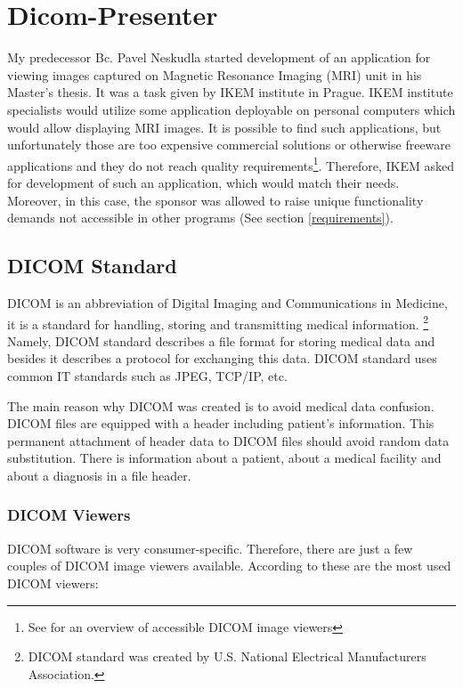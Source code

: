 \chapter{Dicom-Presenter}
\vspace{-10mm}
My predecessor Bc. Pavel Neskudla started development of an application for viewing images captured on Magnetic Resonance Imaging (MRI) unit in his Master's thesis\cite{neskudla}. It was a task given by IKEM institute in Prague. IKEM institute specialists would utilize some application deployable on personal computers which would allow displaying MRI images. It is possible to find such applications, but unfortunately those are too expensive commercial solutions or otherwise freeware applications and they do not reach quality requirements\footnote{See \cite[page~9]{flaska_bc} for an overview of accessible DICOM image viewers}. Therefore, IKEM asked for development of such an application, which would match their needs. Moreover, in this case, the sponsor was allowed to raise unique functionality demands not accessible in other programs (See section \ref{requirements}).

\section{DICOM Standard}

DICOM is an abbreviation of Digital Imaging and Communications in Medicine, it is a standard for handling, storing and transmitting medical information. \footnote{DICOM standard was created by  U.S. National Electrical Manufacturers Association.} Namely, DICOM standard describes a file format for storing medical data and besides it describes a protocol for exchanging this data. DICOM standard uses common IT standards such as JPEG, TCP/IP, etc.

The main reason why DICOM was created is to avoid medical data confusion. DICOM files are equipped with a header including patient's information. This permanent attachment of header data to DICOM files should avoid random data substitution. There is information about a patient, about a medical facility and about a diagnosis in a file header.

\subsection{DICOM Viewers}
\label{viewers}
DICOM software is very consumer-specific. Therefore, there are just a few couples of DICOM image viewers available. According to  these are the most used DICOM viewers:

